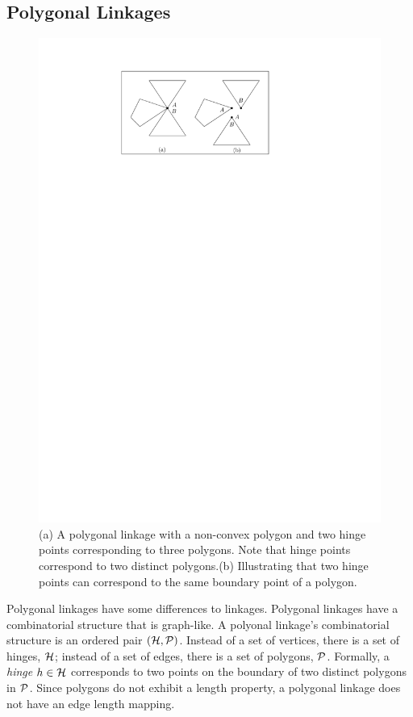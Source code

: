 \subsection{Polygonal Linkages}
\begin{figure}[h]
\begin{center}
\includegraphics[scale=1]{graphics/hingeOnThreeDistinctPolygons.pdf}
\end{center} 
\caption{(a) A polygonal linkage with a non-convex polygon and two hinge points corresponding to 
three polygons.  Note that hinge points correspond to two distinct polygons.(b) Illustrating that 
two hinge points can correspond to the same boundary point of a polygon.}
\label{fig:linkage-1}
\end{figure}
Polygonal linkages have some differences to linkages.  Polygonal linkages have a combinatorial 
structure that is graph-like.  A polyonal linkage's combinatorial structure is an ordered pair 
$\left({\cal H},{\cal P} \right)$.  Instead of a set of vertices, there is a set of hinges, ${\cal H}$;  instead 
of a set of edges, there is a set of polygons, ${\cal P}$. Formally, a \textit{hinge} $h\in {\cal H}$ 
corresponds to two points on the boundary of two distinct polygons in ${\cal P}$.  Since polygons do not 
exhibit a length property, a polygonal linkage does not have an edge length mapping.  


